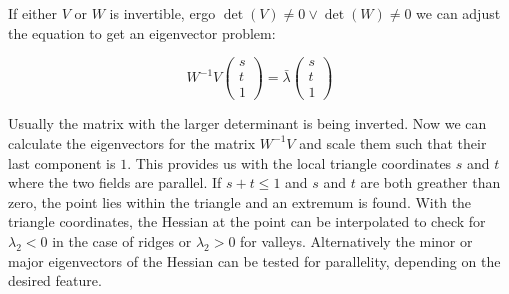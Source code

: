 \noindent If either $V$ or $W$ is invertible, ergo $\det{(V)}\neq 0 \vee
\det{(W)}\neq 0$ we can adjust the equation to get an eigenvector
problem:

\begin{equation}
  W^{-1} V
  \begin{pmatrix}
    s\\
    t\\
    1
  \end{pmatrix}
  = \bar{\lambda}
  \begin{pmatrix}
    s\\
    t\\
    1
  \end{pmatrix}
\end{equation}

\noindent Usually the matrix with the larger determinant is being
inverted. Now we can calculate the eigenvectors for the matrix $W^{-1}
V$ and scale them such that their last component is $1$. This provides
us with the local triangle coordinates $s$ and $t$ where the two fields
are parallel. If $s+t \leq 1$ and $s$ and $t$ are both greather than
zero, the point lies within the triangle and an extremum is found. With
the triangle coordinates, the Hessian at the point can be interpolated to
check for $\lambda_2 < 0$ in the case of ridges or $\lambda_2 > 0$ for
valleys. Alternatively the minor or major eigenvectors of the Hessian
can be tested for parallelity, depending on the desired feature.
